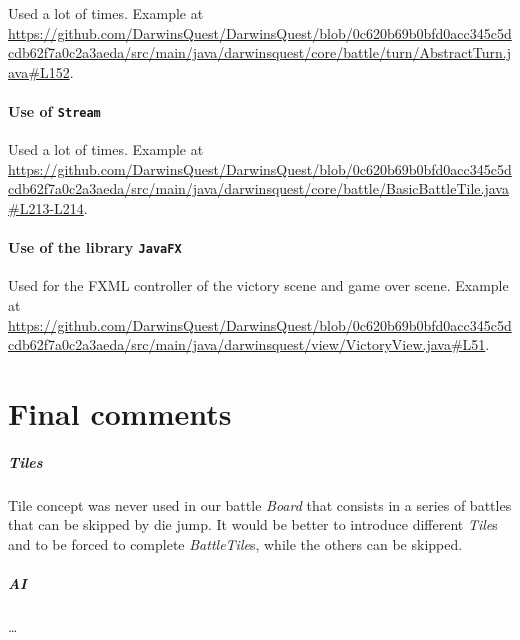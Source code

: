 \documentclass[12pt, a4paper]{report}
\theoremstyle{definition}
\begin{document}
    Used a lot of times.
    Example at \url{https://github.com/DarwinsQuest/DarwinsQuest/blob/0c620b69b0bfd0acc345c5dcdb62f7a0c2a3aeda/src/main/java/darwinsquest/core/battle/turn/AbstractTurn.java#L152}.

    \subsubsection{Use of \texttt{Stream}}

    Used a lot of times.
    Example at \url{https://github.com/DarwinsQuest/DarwinsQuest/blob/0c620b69b0bfd0acc345c5dcdb62f7a0c2a3aeda/src/main/java/darwinsquest/core/battle/BasicBattleTile.java#L213-L214}.

    \subsubsection{Use of the library \texttt{JavaFX}}
    Used for the FXML controller of the victory scene and game over scene.
    Example at \url{https://github.com/DarwinsQuest/DarwinsQuest/blob/0c620b69b0bfd0acc345c5dcdb62f7a0c2a3aeda/src/main/java/darwinsquest/view/VictoryView.java#L51}.


\chapter{Final comments}

    \paragraph{Tiles}
    Tile concept was never used in our battle \emph{Board} that consists in a series of battles that can be skipped by die jump.
    It would be better to introduce different \emph{Tile}s and to be forced to complete \emph{BattleTile}s, while the others can be skipped.

    \paragraph{AI}
    \dots
\end{document}
